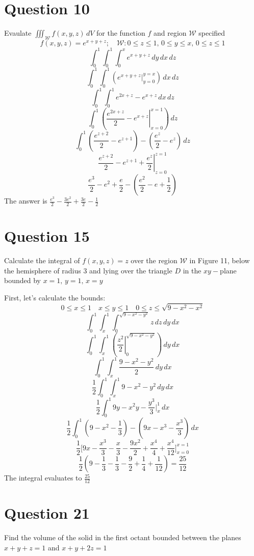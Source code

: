 \documentclass[hidelinks]{article}
\begin{document}
\section{Question 10}
Evaulate $\iiint_{\mathcal{W}}f(x, y,z) \, dV$ for the function $f$ and region $\mathcal{W}$ specified
\[
    f(x, y,z) = e^{x+y+z}; \quad \mathcal{W}: 0\leq z \leq 1, \, 0 \leq y \leq x, \, 0 \leq z \leq 1
\]
\[
    \int_0^1 \int_0^1 \int_0^{x} e^{x+y+z} \, dy \, dx \, dz
\]
\[
    \int_0^1 \int_0^1 \left( e^{x+y+z} \Big |_{y=0}^{y=x} \right) \, dx \, dz
\]
\[
    \int_0^1 \int_0^1 e^{2x+z} - e^{x+z} \, dx \, dz
\]
\[
    \int_0^1 \left( \left. \frac{e^{2x+z}}{2}- e^{x+z} \right |_{x = 0}^{x = 1} \right) \, dz
\]
\[
    \int_0^1 \left(\frac{e^{z+2}}{2}- e^{z+1}\right) - \left( \frac{e^z}{2} - e^z\right) \, dz
\]
\[
    \left. \frac{e^{z+2}}{2}- e^{z+1} + \frac{e^z}{2} \right |_{z = 0}^{z = 1}
\]
\[
    \frac{e^3}{2} - e^{2} + \frac{e}{2} - (\frac{e^2}{2} - e + \frac{1}{2}) 
\]
The answer is $\frac{e^3}{2} -\frac{3e^2}{2} + \frac{3e}{2} - \frac{1}{2}$
\newpage
\section{Question 15}
Calculate the integral of $f(x, y,z) =z$ over the region $\mathcal{W}$ in Figure 11, below the hemisphere of radius 3 and lying over the triangle $D$ in the $xy-$plane bounded by $x=1,\, y=1, \, x=y$

First, let's calculate the bounds:
\[
    0 \leq x \leq 1 \quad x \leq y \leq 1 \quad 0 \leq z \leq \sqrt{9-x^2-x^2}
\]
\[
    \int_0^1 \int_x^1 \int_0^{\sqrt{9-x^2-y^2}} z \, dz \, dy \, dx
\]
\[
    \int_0^1 \int_x^1 \left( \left. \frac{z^2}{2} \right |_0^{\sqrt{9-x^2-y^2}}\right) \, dy \, dx
\]
\[
    \int_0^1 \int_x^1 \frac{9-x^2-y^2}{2} \, dy \, dx
\]
\[
    \frac{1}{2}\int_0^1 \int_x^1 9-x^2-y^2 \, dy \, dx
\]
\[
    \frac{1}{2}\int_0^1 9y-x^2y-\frac{y^3}{3} \Big |_{x}^{1} \, dx
\]
\[
    \frac{1}{2}\int_0^1 (9-x^2-\frac{1}{3}) - (9x-x^3 - \frac{x^3}{3}) \, dx
\]
\[
    \frac{1}{2} \Big[9x-\frac{x^3}{3} - \frac{x}{3} - \frac{9x^2}{2}+ \frac{x^4}{4} + \frac{x^4}{12} \Big]_{x=0}^{x=1}
\]
\[
    \frac{1}{2} (9 - \frac{1}{3} - \frac{1}{3} - \frac{9}{2} +\frac{1}{4} + \frac{1}{12}) = \frac{25}{12}
\]
The integral evaluates to $\frac{25}{12}$
\newpage
\section{Question 21}
Find the volume of the solid in the first octant bounded between the planes $x+y+z=1$ and $x+y+2z=1$
\end{document}
